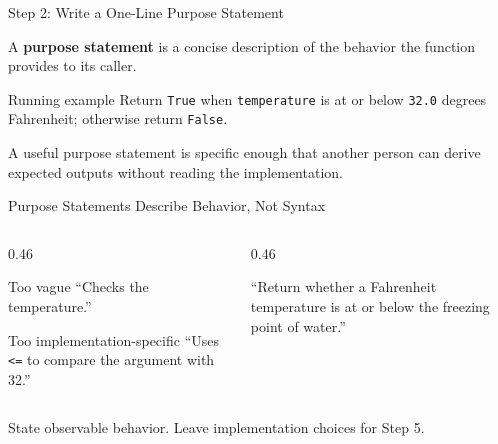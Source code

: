 \documentclass[aspectratio=169,10pt]{beamer}
\begin{document}
\begin{frame}{Step 2: Write a One-Line Purpose Statement}
  \begin{cpdefinition}
    A \textbf{purpose statement} is a concise description of the behavior the function provides to its caller.
  \end{cpdefinition}

  \begin{block}{Running example}
    Return \texttt{True} when \texttt{temperature} is at or below \texttt{32.0} degrees Fahrenheit; otherwise return \texttt{False}.
  \end{block}

  \begin{keyidea}
    A useful purpose statement is specific enough that another person can derive expected outputs without reading the implementation.
  \end{keyidea}
\end{frame}

\begin{frame}{Purpose Statements Describe Behavior, Not Syntax}
  \begin{columns}[T,onlytextwidth]
    \begin{column}{0.46\textwidth}
      \begin{alertblock}{Too vague}
        ``Checks the temperature.''
      \end{alertblock}
      \begin{alertblock}{Too implementation-specific}
        ``Uses \texttt{<=} to compare the argument with 32.''
      \end{alertblock}
    \end{column}
    \begin{column}{0.46\textwidth}
      \begin{exampleblockcp}
        ``Return whether a Fahrenheit temperature is at or below the freezing point of water.''
      \end{exampleblockcp}
    \end{column}
  \end{columns}

  \begin{keyidea}
    State observable behavior. Leave implementation choices for Step 5.
  \end{keyidea}
\end{frame}
\end{document}
